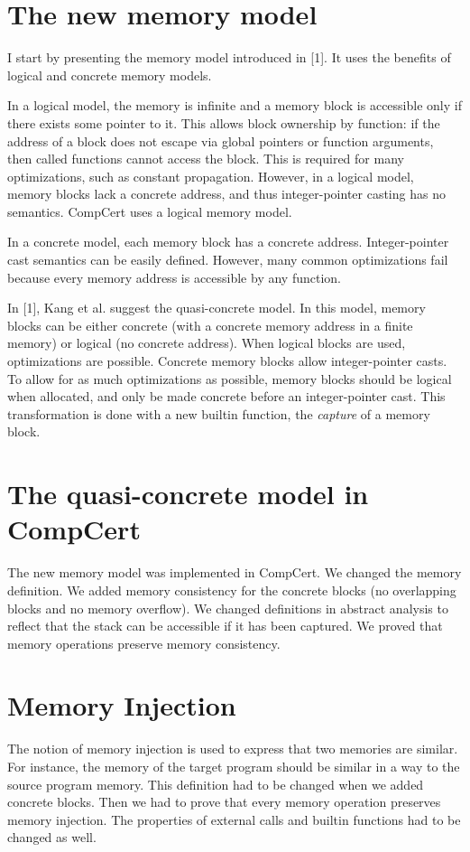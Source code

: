 \documentclass[nocopyrightspace]{sigplanconf}
\begin{document}
\section{The new memory model}
I start by presenting the memory model introduced in [1]. It uses the benefits of logical and concrete memory models.

In a logical model, the memory is infinite and a memory block is accessible only if there exists some pointer to it. This allows block ownership by function: if the address of a block does not escape via global pointers or function arguments, then called functions cannot access the block. This is required for many optimizations, such as constant propagation. However, in a logical model, memory blocks lack a concrete address, and thus integer-pointer casting has no semantics. CompCert uses a logical memory model.

In a concrete model, each memory block has a concrete address. Integer-pointer cast semantics can be easily defined. However, many common optimizations fail because every memory address is accessible by any function.

In [1], Kang et al. suggest the quasi-concrete model. In this model, memory blocks can be either concrete (with a concrete memory address in a finite memory) or logical (no concrete address). When logical blocks are used, optimizations are possible. Concrete memory blocks allow integer-pointer casts. To allow for as much optimizations as possible, memory blocks should be logical when allocated, and only be made concrete before an integer-pointer cast. This transformation is done with a new builtin function, the \textit{capture} of a memory block.

\section{The quasi-concrete model in CompCert}
The new memory model was implemented in CompCert. We changed the memory definition. We added memory consistency for the concrete blocks (no overlapping blocks and no memory overflow). We changed definitions in abstract analysis to reflect that the stack can be accessible if it has been captured. We proved that memory operations preserve memory consistency.

\section{Memory Injection}
The notion of memory injection is used to express that two memories are similar. For instance, the memory of the target program should be similar in a way to the source program memory. This definition had to be changed when we added concrete blocks. Then we had to prove that every memory operation preserves memory injection. The properties of external calls and builtin functions had to be changed as well. 
\end{document}
